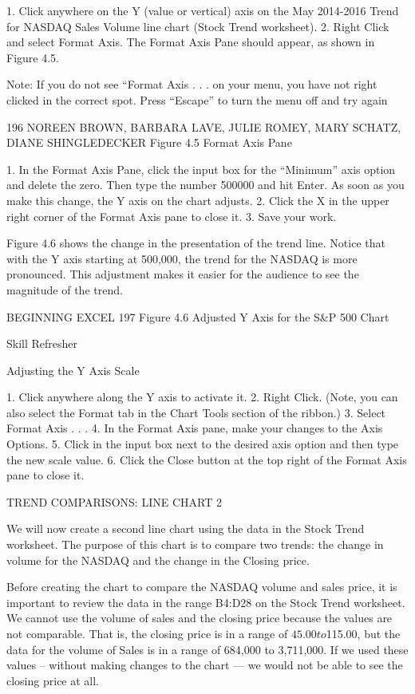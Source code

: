 1. Click anywhere on the Y (value or vertical) axis on the May 2014-2016 Trend for NASDAQ
Sales Volume line chart (Stock Trend worksheet).
2. Right Click and select Format Axis. The Format Axis Pane should appear, as shown in Figure
4.5.




Note: If you do not see “Format Axis . . . on your menu, you have not right clicked in the correct spot.
Press “Escape” to turn the menu off and try again




196 NOREEN BROWN, BARBARA LAVE, JULIE ROMEY, MARY SCHATZ, DIANE SHINGLEDECKER
Figure 4.5 Format Axis Pane


1. In the Format Axis Pane, click the input box for the “Minimum” axis option and delete the zero.
Then type the number 500000 and hit Enter. As soon as you make this change, the Y axis on the
chart adjusts.
2. Click the X in the upper right corner of the Format Axis pane to close it.
3. Save your work.

Figure 4.6 shows the change in the presentation of the trend line. Notice that with the Y axis starting
at 500,000, the trend for the NASDAQ is more pronounced. This adjustment makes it easier for the
audience to see the magnitude of the trend.




BEGINNING EXCEL 197
Figure 4.6 Adjusted Y Axis for the S&P 500 Chart




Skill Refresher


Adjusting the Y Axis Scale

1. Click anywhere along the Y axis to activate it.
2. Right Click.
(Note, you can also select the Format tab in the Chart Tools section of the ribbon.)
3. Select Format Axis . . .
4. In the Format Axis pane, make your changes to the Axis Options.
5. Click in the input box next to the desired axis option and then type the new scale value.
6. Click the Close button at the top right of the Format Axis pane to close it.



TREND COMPARISONS: LINE CHART 2

We will now create a second line chart using the data in the Stock Trend worksheet. The purpose of
this chart is to compare two trends: the change in volume for the NASDAQ and the change in the
Closing price.

Before creating the chart to compare the NASDAQ volume and sales price, it is important to review
the data in the range B4:D28 on the Stock Trend worksheet. We cannot use the volume of sales and the
closing price because the values are not comparable. That is, the closing price is in a range of $45.00
to $115.00, but the data for the volume of Sales is in a range of 684,000 to 3,711,000. If we used these
values – without making changes to the chart — we would not be able to see the closing price at all.

